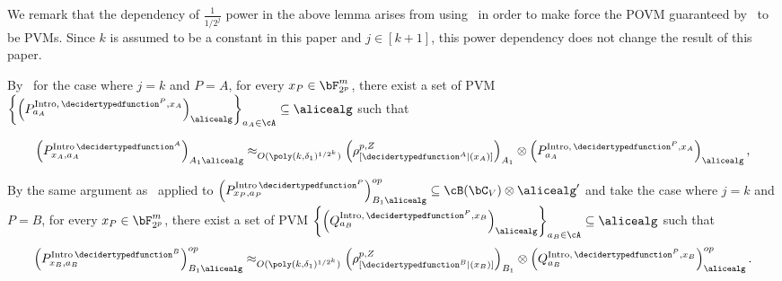 We remark that the dependency of $\frac{1}{1/2^j}$ power in the above lemma arises from using~ in order to make force the POVM guaranteed by~ to be PVMs. Since $k$ is assumed to be a constant in this paper and $j \in[k+1]$, this power dependency does not change the result of this paper. 

By~ for the case where $j = k$ and $P = A$, for every $x_P \in \bF_{2^p}^m$, there exist a set of PVM $\left\{\left(P^{\text{Intro}, \, \decidertypedfunction^P, x_A}_{a_A} \right)_{\alicealg} \right\}_{a_A \in \cA} \subseteq \alicealg$ such that

\begin{equation} \label{eq:QRsoundnessAlice}
	\left(P^{\text{Intro} \, \decidertypedfunction^A}_{x_A, a_A} \right)_{A_1 \alicealg} \approx_{O(\poly(k, \delta_1)^{1/2^k})} \left(\rho^{p,Z}_{[\decidertypedfunction^A|(x_A) ]}\right)_{A_1} \otimes \left(P^{\text{Intro}, \, \decidertypedfunction^P, x_A}_{a_A} \right)_{\alicealg}, 
\end{equation}

By the same argument as~ applied to $\left(P^{\text{Intro} \, \decidertypedfunction^P}_{x_P, a_P} \right)_{B_1 \alicealg}^{op} \subseteq \cB(\bC_{V}) \otimes \alicealg'$ and take the case where $j = k$ and $P = B$, for every $x_P \in \bF_{2^p}^m$, there exist a set of PVM $\left\{\left(Q^{\text{Intro}, \, \decidertypedfunction^P, x_B}_{a_B} \right)_{\alicealg} \right\}_{a_B \in \cA} \subseteq \alicealg$ such that
\begin{equation}\label{eq:QRsoundnessBob}
	\left(P^{\text{Intro} \, \decidertypedfunction^B}_{x_B, a_B} \right)_{B_1 \alicealg}^{op} \approx_{O(\poly(k, \delta_1)^{1/2^k})} \left(\rho^{p,Z}_{[\decidertypedfunction^B|(x_B) ]}\right)_{B_1} \otimes \left(Q^{\text{Intro}, \, \decidertypedfunction^P, x_B}_{a_B} \right)_{\alicealg}^{op}. 
\end{equation}


